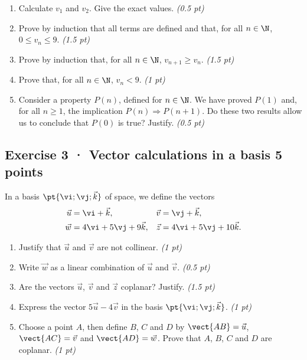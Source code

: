 \begin{enumerate}

\item Calculate $v_1$ and $v_2$. Give the exact values. \hfill\textit{(0.5 pt)}

\item Prove by induction that all terms are defined and that, for all $n\in\N$, $0\le v_n\le9$. \hfill\textit{(1.5 pt)}

\item Prove by induction that, for all $n\in\N$, $v_{n+1}\ge v_n$. \hfill\textit{(1.5 pt)}

\item Prove that, for all $n\in\N$, $v_n<9$. \hfill\textit{(1 pt)}

\item Consider a property $P(n)$, defined for $n\in\N$. We have proved $P(1)$ and, for all $n\ge1$, the implication $P(n)\Rightarrow P(n+1)$. Do these two results allow us to conclude that $P(0)$ is true? Justify. \hfill\textit{(0.5 pt)}

\end{enumerate}

\mxnewpage{}

\subsection*{Exercise 3 · Vector calculations in a basis \hfill 5 points}In a basis $\pt{\vi;\vj;\vec k}$ of space, we define the vectors
\[\begin{aligned}\vec u&=\vi+\vec k,&\vec v&=\vj+\vec k,\\
\vec w&=4\vi+5\vj+9\vec k,&\vec z&=4\vi+5\vj+10\vec k.\end{aligned}\]

\begin{enumerate}

\item Justify that $\vec u$ and $\vec v$ are not collinear. \hfill\textit{(1 pt)}

\item Write $\vec w$ as a linear combination of $\vec u$ and $\vec v$. \hfill\textit{(0.5 pt)}

\item Are the vectors $\vec u$, $\vec v$ and $\vec z$ coplanar? Justify. \hfill\textit{(1.5 pt)}

\item Express the vector $5\vec u-4\vec v$ in the basis $\pt{\vi;\vj;\vec k}$. \hfill\textit{(1 pt)}

\item Choose a point $A$, then define $B$, $C$ and $D$ by $\vect{AB}=\vec u$, $\vect{AC}=\vec v$ and $\vect{AD}=\vec w$. Prove that $A$, $B$, $C$ and $D$ are coplanar. \hfill\textit{(1 pt)}

\end{enumerate}

